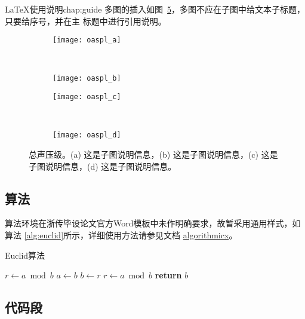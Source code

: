 \begin{cuzchapter}{\LaTeX{}使用说明}{chap:guide}
多图的插入如图~\ref{fig:oaspl}，多图不应在子图中给文本子标题，只要给序号，并在主
标题中进行引用说明。
\begin{figure}[!htbp]
    \centering
    \begin{subfigure}[b]{0.35\textwidth}
      \texttt{[image: oaspl\_a]}
      \caption{}
      \label{fig:oaspl_a}
    \end{subfigure}%
    ~%
    \begin{subfigure}[b]{0.35\textwidth}
      \texttt{[image: oaspl\_b]}
      \caption{}
      \label{fig:oaspl_b}
    \end{subfigure}
    \begin{subfigure}[b]{0.35\textwidth}
      \texttt{[image: oaspl\_c]}
      \caption{}
      \label{fig:oaspl_c}
    \end{subfigure}%
    ~%
    \begin{subfigure}[b]{0.35\textwidth}
      \texttt{[image: oaspl\_d]}
      \caption{}
      \label{fig:oaspl_d}
    \end{subfigure}
    \caption[总声压级]{总声压级。(a) 这是子图说明信息，(b) 这是子图说明信息，(c) 这是子图说明信息，(d) 这是子图说明信息。}
    \label{fig:oaspl}
\end{figure}

\subsection{算法}\label{sub:algorithms}

算法环境在浙传毕设论文官方Word模板中未作明确要求，故暂采用通用样式，如算法
\ref{alg:euclid}所示，详细使用方法请参见文档
\href{https://ctan.org/pkg/algorithmicx?lang=en}{algorithmicx}。

\begin{algorithm}[!htbp]
    \small
    \caption{Euclid算法}\label{alg:euclid}
    \begin{algorithmic}[1]
        \State $r\gets a\bmod b$
        \State $a\gets b$
        \State $b\gets r$
        \State $r\gets a\bmod b$
        \EndWhile\label{euclidendwhile}
        \State \textbf{return} $b$
        \EndProcedure
    \end{algorithmic}
\end{algorithm}

\subsection{代码段}\label{sub:listings}


\end{cuzchapter}
